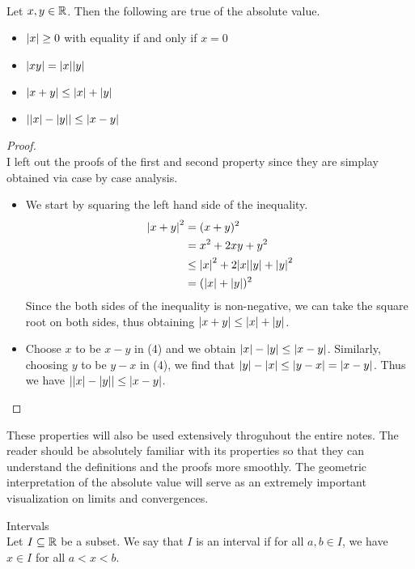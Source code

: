 \documentclass[a4paper]{article}
\begin{document}
\begin{prp}{}{}\\ Let $x,y\in\mathbb{R}$. Then the following are true of the absolute value. 
\begin{itemize}
\item $\abs{x}\geq 0$ with equality if and only if $x=0$
\item $\abs{xy}=\abs{x}\abs{y}$
\item $\abs{x+y}\leq\abs{x}+\abs{y}$
\item $\abs{\abs{x}-\abs{y}}\leq\abs{x-y}$
\end{itemize}
\begin{proof}\\ I left out the proofs of the first and second property since they are simplay obtained via case by case analysis. 
\begin{itemize}
\item We start by squaring the left hand side of the inequality. 
\begin{align*}
\abs{x+y}^2&=(x+y)^2 \\
&=x^2+2xy+y^2 \\
&\leq \abs{x}^2+2\abs{x}\abs{y}+\abs{y}^2 \\
&=(\abs{x}+\abs{y})^2
\end{align*}
Since the both sides of the inequality is non-negative, we can take the square root on both sides, thus obtaining $\abs{x+y}\leq\abs{x}+\abs{y}$. 
\item Choose $x$ to be $x-y$ in (4) and we obtain $\abs{x}-\abs{y}\leq\abs{x-y}$. Similarly, choosing $y$ to be $y-x$ in (4), we find that $\abs{y}-\abs{x}\leq\abs{y-x}=\abs{x-y}$. Thus we have $\abs{\abs{x}-\abs{y}}\leq\abs{x-y}$. 
\end{itemize}
\end{proof}
\end{prp}

These properties will also be used extensively throguhout the entire notes. The reader should be absolutely familiar with its properties so that they can understand the definitions and the proofs more smoothly. The geometric interpretation of the absolute value will serve as an extremely important visualization on limits and convergences. 

\begin{defn}{Intervals}{}\\ Let $I\subseteq\mathbb{R}$ be a subset. We say that $I$ is an interval if for all $a,b\in I$, we have $x\in I$ for all $a<x<b$. 
\end{defn}
\end{document}
